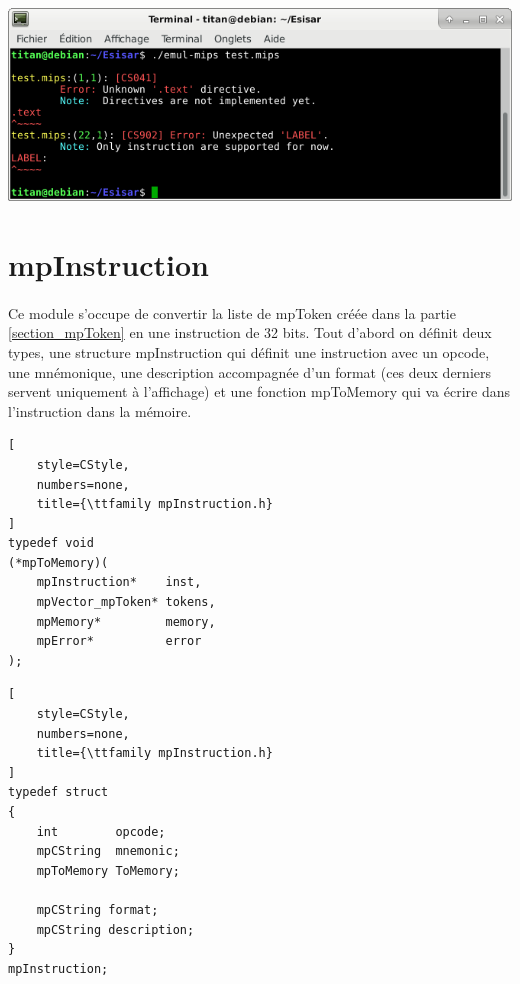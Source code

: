 \documentclass[12pt]{report} %
\begin{document}
    \begin{center}
        \includegraphics[width=\textwidth]{MIPS-mpToken-directive-label.png}
    \end{center}

\section{mpInstruction}
\label{section_mpInstruction}

\paragraph{}
Ce module s'occupe de convertir la liste de {\ttfamily mpToken} créée dans la partie \ref{section_mpToken} en une instruction de 32 bits. Tout d'abord on définit deux types, une structure {\ttfamily mpInstruction} qui définit une instruction avec un {\ttfamily opcode}, une mnémonique, une description accompagnée d'un format (ces deux derniers servent uniquement à l'affichage) et une fonction {\ttfamily mpToMemory} qui va écrire dans l'instruction dans la mémoire.

\noindent
\begin{minipage}[t]{.45\textwidth}
\begin{lstlisting}[
    style=CStyle,
    numbers=none,
    title={\ttfamily mpInstruction.h}
]
typedef void
(*mpToMemory)(
    mpInstruction*    inst,
    mpVector_mpToken* tokens,
    mpMemory*         memory,
    mpError*          error
);
\end{lstlisting}
\end{minipage}\hfill
%
\begin{minipage}[t]{.45\textwidth}
\begin{lstlisting}[
    style=CStyle,
    numbers=none,
    title={\ttfamily mpInstruction.h}
]
typedef struct
{
    int        opcode;
    mpCString  mnemonic;
    mpToMemory ToMemory;

    mpCString format;
    mpCString description;
}
mpInstruction;
\end{lstlisting}
\end{minipage}
\end{document}
